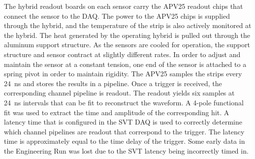 \indent The hybrid readout boards on each sensor carry the APV25 readout chips that connect the sensor to the DAQ. The power to the APV25 chips is supplied through the hybrid, and the temperature of the strip is also actively monitored at the hybrid. The heat generated by the operating hybrid is pulled out through the aluminum support structure. As the sensors are cooled for operation, the support structure and sensor contract at slightly different rates. In order to adjust and maintain the sensor at a constant tension, one end of the sensor is attached to a spring pivot in order to maintain rigidity. The APV25 samples the strips every 24~ns and stores the results in a pipeline. Once a trigger is received, the corresponding channel pipeline is readout. The readout yields six samples at 24~ns intervals that can be fit to reconstruct the waveform. A 4-pole functional fit was used to extract the time and amplitude of the corresponding hit. A latency time that is configured in the SVT DAQ is used to correctly determine which channel pipelines are readout that correspond to the trigger. The latency time is approximately equal to the time delay of the trigger. Some early data in the Engineering Run was lost due to the SVT latency being incorrectly timed in. 
